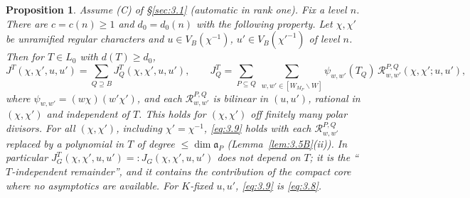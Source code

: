 \documentclass[12pt,letterpaper]{article}
\numberwithin{equation}{section}
\theoremstyle{plain}
\newtheorem{proposition}[lemma]{Proposition}
\theoremstyle{remark}
\theoremstyle{plain}
\theoremstyle{definition}
\theoremstyle{remark}
\theoremstyle{remark}
\newcommand{\fa}{\mathfrak{a}}
\newcommand{\Wrep}[1]{[W_{#1}\backslash W]}
\begin{document}
\setcounter{lemma}{5}%
\begin{proposition}\label{prop:3.6}
Assume (C) of \S\ref{sec:3.1} (automatic in rank one). Fix a level $n$. There are $c=c(n)\ge1$ and $d_0=d_0(n)$ with the following property. Let $\chi,\chi'$ be unramified regular characters and $u\in V_B(\chi^{-1})$, $u'\in V_B(\chi'^{-1})$ of level $n$. Then for $T\in L_0$ with $d(T)\ge d_0$,
\begin{equation}\label{eq:3.9}
J^T(\chi,\chi',u,u')=\sum_{Q\supseteq B}J^T_Q(\chi,\chi',u,u'),\qquad
J^T_Q=\sum_{P\subseteq Q}\ \sum_{w,w'\in\Wrep{M_P}}\psi_{w,w'}(T_Q)\,\mathcal{R}^{P,Q}_{w,w'}(\chi,\chi';u,u'),
\end{equation}
where $\psi_{w,w'}=(w\chi)(w'\chi')$, and each $\mathcal R^{P,Q}_{w,w'}$ is bilinear in $(u,u')$, rational in $(\chi,\chi')$ and independent of $T$. This holds for $(\chi,\chi')$ off finitely many polar divisors. For all $(\chi,\chi')$, including $\chi'=\chi^{-1}$, \eqref{eq:3.9} holds with each $\mathcal R^{P,Q}_{w,w'}$ replaced by a polynomial in $T$ of degree $\le\dim\fa_P$ (Lemma~\ref{lem:3.5B}(ii)). In particular $J^T_G(\chi,\chi',u,u')=:J_G(\chi,\chi',u,u')$ does not depend on $T$; it is the ``$T$-independent remainder'', and it contains the contribution of the compact core where no asymptotics are available. For $K$-fixed $u,u'$, \eqref{eq:3.9} is \eqref{eq:3.8}.
\end{proposition}
\end{document}
